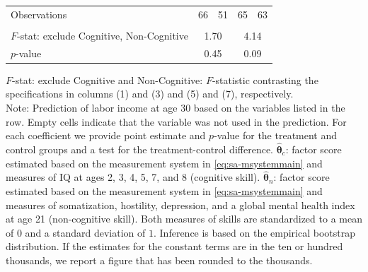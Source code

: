 \documentclass[static]{JJH-Beamer}
\begin{document}
\begin{frame}
\begin{table}[H]
\begin{center}
{\begin{tabular}{lcccccccc}
Observations &         \multicolumn{2}{c}{66} &          \multicolumn{2}{c}{51} &              \multicolumn{2}{c}{65} &             \multicolumn{2}{c}{63}  \\  \\ \midrule
$F$-stat: exclude Cognitive, Non-Cognitive &              \multicolumn{4}{c}{1.70} &               \multicolumn{4}{c}{4.14}  \\
$p$-value  &         \multicolumn{4}{c}{0.45} &                   \multicolumn{4}{c}{0.09} \\
\bottomrule
\end{tabular}
}
\end{center}
\tiny \flushleft
$F$-stat: exclude Cognitive and Non-Cognitive: $F$-statistic contrasting the specifications in columns (1) and (3) and (5) and (7), respectively.\\
Note: Prediction of labor income at age 30 based on the variables listed in the row. Empty cells indicate that the variable was not used in the prediction. For each coefficient we provide point estimate and $p$-value for the treatment and control groups and a test for the treatment-control difference. $\hat{\bm{\theta}}_{c}$: factor score estimated based on the measurement system in \eqref{eq:sa-msystemmain} and measures of IQ at ages 2, 3, 4, 5, 7, and 8 (cognitive skill). $\hat{\bm{\theta}}_{n}$: factor score estimated based on the measurement system in \eqref{eq:sa-msystemmain} and measures of somatization, hostility, depression, and a global mental health index at age 21 (non-cognitive skill). Both measures of skills are standardized to a mean of $0$ and a standard deviation of $1$. Inference is based on the empirical bootstrap distribution. If the estimates for the constant terms are in the ten or hundred thousands, we report a figure that has been rounded to the thousands.\\
\end{table}

\end{frame}
\end{document}
